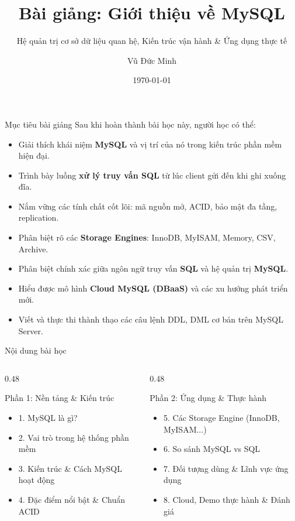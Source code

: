 \documentclass[aspectratio=169,11pt]{beamer}
\title[Giới thiệu MySQL]{Bài giảng: Giới thiệu về MySQL}
\subtitle{Hệ quản trị cơ sở dữ liệu quan hệ, Kiến trúc vận hành \& Ứng dụng thực tế}
\author[Vũ Đức Minh]{Vũ Đức Minh}
\institute[NEU]{Trường Đại học Kinh tế Quốc dân (NEU), Hà Nội, Việt Nam}
\date{\today}
\newcommand{\kw}[1]{\textcolor{dbblue}{\textbf{#1}}}
\begin{document}
\begin{frame}
  \titlepage
\end{frame}

\begin{frame}{Mục tiêu bài giảng}
Sau khi hoàn thành bài học này, người học có thể:
\begin{itemize}\setlength{\itemsep}{3pt}
  \item Giải thích khái niệm \kw{MySQL} và vị trí của nó trong kiến trúc phần mềm hiện đại.
  \item Trình bày luồng \kw{xử lý truy vấn SQL} từ lúc client gửi đến khi ghi xuống đĩa.
  \item Nắm vững các tính chất cốt lõi: mã nguồn mở, ACID, bảo mật đa tầng, replication.
  \item Phân biệt rõ các \kw{Storage Engines}: InnoDB, MyISAM, Memory, CSV, Archive.
  \item Phân biệt chính xác giữa ngôn ngữ truy vấn \kw{SQL} và hệ quản trị \kw{MySQL}.
  \item Hiểu được mô hình \kw{Cloud MySQL (DBaaS)} và các xu hướng phát triển mới.
  \item Viết và thực thi thành thạo các câu lệnh DDL, DML cơ bản trên MySQL Server.
\end{itemize}
\end{frame}

\begin{frame}{Nội dung bài học}
\begin{columns}[t]
  \begin{column}{0.48\textwidth}
    \begin{block}{Phần 1: Nền tảng \& Kiến trúc}
      \begin{itemize}
        \item 1. MySQL là gì?
        \item 2. Vai trò trong hệ thống phần mềm
        \item 3. Kiến trúc \& Cách MySQL hoạt động
        \item 4. Đặc điểm nổi bật \& Chuẩn ACID
      \end{itemize}
    \end{block}
  \end{column}
  \begin{column}{0.48\textwidth}
    \begin{block}{Phần 2: Ứng dụng \& Thực hành}
      \begin{itemize}
        \item 5. Các Storage Engine (InnoDB, MyISAM...)
        \item 6. So sánh MySQL vs SQL
        \item 7. Đối tượng dùng \& Lĩnh vực ứng dụng
        \item 8. Cloud, Demo thực hành \& Đánh giá
      \end{itemize}
    \end{block}
  \end{column}
\end{columns}
\end{frame}
\end{document}
